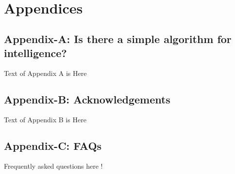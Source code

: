 \documentclass[a4paper,12pt]{report}%
\begin{document}
\chapter{\color{IAF} \bf Appendices}
\section{\color{IAF} Appendix-A: Is there a simple algorithm for intelligence?} \label{App:Appendix A}

Text of Appendix A is Here

\section{\color{IAF} Appendix-B: Acknowledgements} \label{App: Appendix B}

Text of Appendix B is Here

\section{\color{IAF} Appendix-C: FAQs}

Frequently asked questions here !



\newpage
\end{document}
